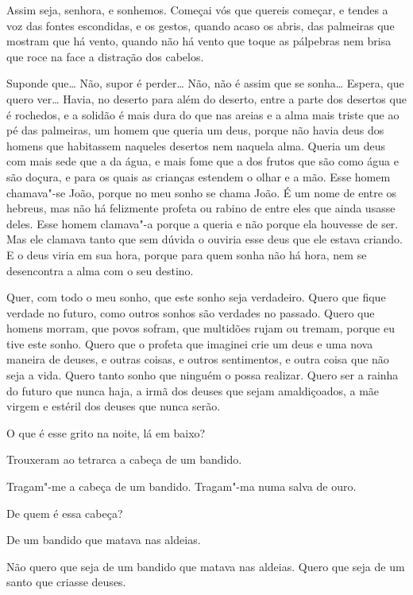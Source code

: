  Assim seja, senhora, e sonhemos. Começai vós que quereis começar,
e tendes a voz das fontes escondidas, e os gestos, quando acaso os
abris, das palmeiras que mostram que há vento, quando não há vento
que toque as pálpebras nem brisa que roce na face a distração dos
cabelos.

  Suponde que\ldots{} Não,
supor é perder\ldots{} Não, não é assim que se sonha\ldots{} Espera, que quero
ver\ldots{}  Havia, no deserto para além do deserto,
entre a parte dos desertos que é rochedos, e a solidão é mais dura do
que nas areias e a alma mais triste que ao pé das palmeiras, um homem
que queria um deus, porque não havia deus dos homens que habitassem
naqueles desertos nem naquela alma. Queria um deus com mais sede que
a da água, e mais fome que a dos frutos que são como água e são
doçura, e para os quais as crianças estendem o olhar e a mão. Esse
homem chamava"-se João, porque no meu sonho se chama João. É um nome
de entre os hebreus, mas não há felizmente profeta ou rabino de entre
eles que ainda usasse deles. Esse homem clamava"-a porque a queria e
não porque ela houvesse de ser. Mas ele clamava tanto que sem dúvida
o ouviria esse deus que ele estava criando. E o deus viria em sua
hora, porque para quem sonha não há hora, nem se desencontra a alma
com o seu destino. 

 Quer, com todo o meu sonho, que este sonho seja verdadeiro.
Quero que fique verdade no futuro, como outros sonhos são verdades no
passado. Quero que homens morram, que povos sofram, que multidões
rujam ou tremam, porque eu tive este sonho. Quero que o profeta que
imaginei crie um deus e uma nova maneira de deuses, e outras coisas,
e outros sentimentos, e outra coisa que não seja a vida. Quero tanto
sonho que ninguém o possa realizar. Quero ser a rainha do futuro que
nunca haja, a irmã dos deuses que sejam amaldiçoados, a mãe virgem e
estéril dos deuses que nunca serão.

 O que é esse grito na noite, lá em baixo?

 Trouxeram ao tetrarca a cabeça de um bandido.

 Tragam"-me a cabeça de um bandido. Tragam"-ma numa salva de
ouro.

 De quem é essa cabeça?

 De um bandido que matava nas aldeias.

 Não quero que seja de um bandido que matava nas aldeias.
Quero que seja de um santo que criasse deuses.

